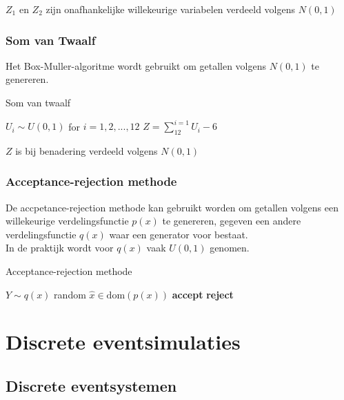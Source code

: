 \documentclass{article}
\begin{document}
	$Z_1$ en $Z_2$ zijn onafhankelijke willekeurige variabelen verdeeld volgens $N(0,1)$
	
	
	\subsubsection{Som van Twaalf}
	
	Het Box-Muller-algoritme wordt gebruikt om getallen volgens $N(0,1)$ te genereren.
	
	\begin{algorithm}[!ht]
		\caption{Som van twaalf}
		\begin{algorithmic}[1]
				\State $U_i \sim U(0,1)$ for $i=1,2,...,12$
				\State $Z = \sum_{12}^{i=1}U_i - 6$
			\EndProcedure
		\end{algorithmic}
	\end{algorithm}

	$Z$ is bij benadering verdeeld volgens $N(0,1)$
	
	\subsubsection{Acceptance-rejection methode}
	
	De accpetance-rejection methode kan gebruikt worden om getallen volgens een willekeurige verdelingsfunctie $p(x)$ te genereren, gegeven een andere verdelingsfunctie $q(x)$ waar een generator voor bestaat.\\
	
	In de praktijk wordt voor $q(x)$ vaak $U(0,1)$ genomen.
	
	\begin{algorithm}[!ht]
		\caption{Acceptance-rejection methode}
		\begin{algorithmic}[1]
				\State $Y \sim q(x)$ random
				\State $\hat{x} \in \text{dom}(p(x))$
					\State \textbf{accept}
					\State \textbf{reject}
				\EndIf
			\EndProcedure
		\end{algorithmic}
	\end{algorithm}
	
	
	\section{Discrete eventsimulaties}

	
	\subsection{Discrete eventsystemen}
	
\end{document}
